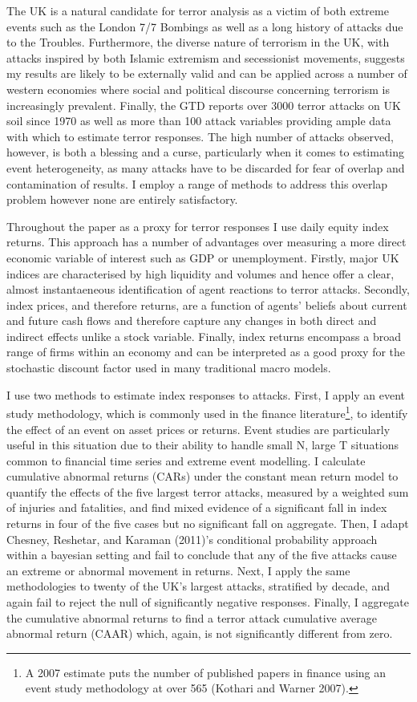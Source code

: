 \documentclass[]{AEA}
\begin{document}
The UK is a natural candidate for terror analysis as a victim of both
extreme events such as the London 7/7 Bombings as well as a long history
of attacks due to the Troubles. Furthermore, the diverse nature of
terrorism in the UK, with attacks inspired by both Islamic extremism and
secessionist movements, suggests my results are likely to be externally
valid and can be applied across a number of western economies where
social and political discourse concerning terrorism is increasingly
prevalent. Finally, the GTD reports over 3000 terror attacks on UK soil
since 1970 as well as more than 100 attack variables providing ample
data with which to estimate terror responses. The high number of attacks
observed, however, is both a blessing and a curse, particularly when it
comes to estimating event heterogeneity, as many attacks have to be
discarded for fear of overlap and contamination of results. I employ a
range of methods to address this overlap problem however none are
entirely satisfactory.

Throughout the paper as a proxy for terror responses I use daily equity
index returns. This approach has a number of advantages over measuring a
more direct economic variable of interest such as GDP or unemployment.
Firstly, major UK indices are characterised by high liquidity and
volumes and hence offer a clear, almost instantaeneous identification of
agent reactions to terror attacks. Secondly, index prices, and therefore
returns, are a function of agents' beliefs about current and future cash
flows and therefore capture any changes in both direct and indirect
effects unlike a stock variable. Finally, index returns encompass a
broad range of firms within an economy and can be interpreted as a good
proxy for the stochastic discount factor used in many traditional macro
models.

I use two methods to estimate index responses to attacks. First, I apply
an event study methodology, which is commonly used in the finance
literature\footnote{A 2007 estimate puts the number of published papers
  in finance using an event study methodology at over 565 (Kothari and
  Warner 2007).}, to identify the effect of an event on asset prices or
returns. Event studies are particularly useful in this situation due to
their ability to handle small N, large T situations common to financial
time series and extreme event modelling. I calculate cumulative abnormal
returns (CARs) under the constant mean return model to quantify the
effects of the five largest terror attacks, measured by a weighted sum
of injuries and fatalities, and find mixed evidence of a significant
fall in index returns in four of the five cases but no significant fall
on aggregate. Then, I adapt Chesney, Reshetar, and Karaman (2011)'s
conditional probability approach within a bayesian setting and fail to
conclude that any of the five attacks cause an extreme or abnormal
movement in returns. Next, I apply the same methodologies to twenty of
the UK's largest attacks, stratified by decade, and again fail to reject
the null of significantly negative responses. Finally, I aggregate the
cumulative abnormal returns to find a terror attack cumulative average
abnormal return (CAAR) which, again, is not significantly different from
zero.
\end{document}
